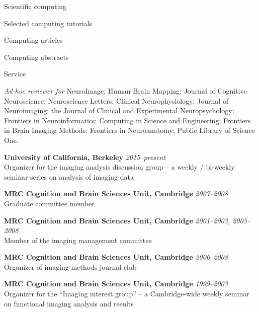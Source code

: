 \documentclass{cv}
\newcommand{\PlaceDateNote}[3]{{\bf #1} \hfill {\em #2} \\#3}
\newcommand{\UCB}{University of California, Berkeley}
\newcommand{\CBU}{MRC Cognition and Brain Sciences Unit, Cambridge}
\begin{document}
\begin{cvSection}{Scientific computing}
\begin{cvSubSection}{Selected computing tutorials}

\printbibliography[heading=none,
    keyword=computing,
    keyword=online,
notkeyword=omit]

\end{cvSubSection}

\begin{cvSubSection}{Computing articles}

\printbibliography[heading=none,
    keyword=computing,
    keyword=article,
notkeyword=omit]

\end{cvSubSection}

\begin{cvSubSection}{Computing abstracts}

\printbibliography[heading=none,
    keyword=computing,
    keyword=abstract,
notkeyword=omit]

\end{cvSubSection}

\end{cvSection}

\begin{cvSection}{Service}

    {\em Ad-hoc reviewer for} NeuroImage; Human Brain Mapping; Journal of
    Cognitive Neuroscience; Neuroscience Letters; Clinical Neurophysiology;
    Journal of Neuroimaging; the Journal of Clinical and Experimental
    Neuropsychology; Frontiers in Neuroinformatics; Computing in Science and
    Engineering; Frontiers in Brain Imaging Methods; Frontiers in
    Neuroanatomy; Public Library of Science One.

\PlaceDateNote{\UCB}{2015--present}
{Organizer for the imaging analysis discussion group -- a weekly / bi-weekly
seminar series on analysis of imaging data}

\PlaceDateNote{\CBU}{2007--2008}
{Graduate committee member}

\PlaceDateNote{\CBU}{2001--2003, 2005--2008}
{Member of the imaging management committee}

\PlaceDateNote{\CBU}{2006--2008}
{Organizer of imaging methods journal club}

\PlaceDateNote{\CBU}{1999--2003}
{Organizer for the ``Imaging interest group'' -- a Cambridge-wide weekly
seminar on functional imaging analysis and results}

\end{cvSection}
\end{document}
